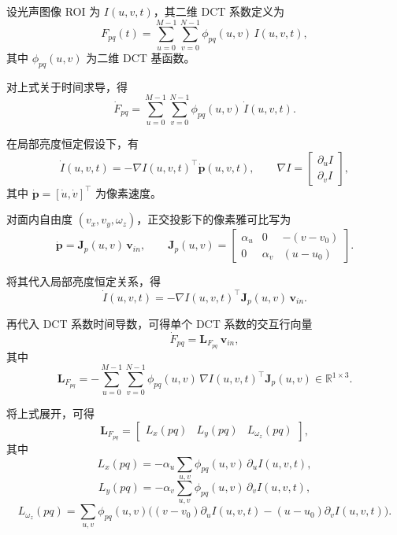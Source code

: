 \documentclass{article}
\begin{document}
设光声图像 ROI 为 $I(u,v,t)$，其二维 DCT 系数定义为
\begin{equation}
F_{pq}(t) = \sum_{u=0}^{M-1}\sum_{v=0}^{N-1}\phi_{pq}(u,v)\,I(u,v,t),
\end{equation}
其中 $\phi_{pq}(u,v)$ 为二维 DCT 基函数。

对上式关于时间求导，得
\begin{equation}
\dot{F}_{pq} = \sum_{u=0}^{M-1}\sum_{v=0}^{N-1}\phi_{pq}(u,v)\,\dot{I}(u,v,t).
\end{equation}

在局部亮度恒定假设下，有
\begin{equation}
\dot{I}(u,v,t) = -\nabla I(u,v,t)^{\top}\dot{\mathbf{p}}(u,v,t), \qquad
\nabla I =
\begin{bmatrix}
\partial_u I \\ \partial_v I
\end{bmatrix},
\end{equation}
其中 $\dot{\mathbf{p}} = [\dot{u}, \dot{v}]^\top$ 为像素速度。

对面内自由度 $(v_x,v_y,\omega_z)$，正交投影下的像素雅可比写为
\begin{equation}
\dot{\mathbf{p}} = \mathbf{J}_{p}(u,v)\,\mathbf{v}_{in}, \qquad
\mathbf{J}_{p}(u,v) =
\begin{bmatrix}
\alpha_u & 0 & -(v-v_0) \\
0 & \alpha_v & (u-u_0)
\end{bmatrix}.
\end{equation}

将其代入局部亮度恒定关系，得
\begin{equation}
\dot{I}(u,v,t) = -\nabla I(u,v,t)^{\top}\mathbf{J}_{p}(u,v)\,\mathbf{v}_{in}.
\end{equation}

再代入 DCT 系数时间导数，可得单个 DCT 系数的交互行向量
\begin{equation}
\dot{F}_{pq} = \mathbf{L}_{F_{pq}}\,\mathbf{v}_{in},
\end{equation}
其中
\begin{equation}
\mathbf{L}_{F_{pq}}
=
-\sum_{u=0}^{M-1}\sum_{v=0}^{N-1}
\phi_{pq}(u,v)\,\nabla I(u,v,t)^{\top}\mathbf{J}_{p}(u,v)
\in \mathbb{R}^{1\times 3}.
\end{equation}

将上式展开，可得
\begin{equation}
\mathbf{L}_{F_{pq}} =
\begin{bmatrix}
L_x(pq) & L_y(pq) & L_{\omega_z}(pq)
\end{bmatrix},
\end{equation}
其中
\begin{equation}
L_x(pq) = -\alpha_u \sum_{u,v}\phi_{pq}(u,v)\,\partial_u I(u,v,t),
\end{equation}
\begin{equation}
L_y(pq) = -\alpha_v \sum_{u,v}\phi_{pq}(u,v)\,\partial_v I(u,v,t),
\end{equation}
\begin{equation}
L_{\omega_z}(pq)
=
\sum_{u,v}\phi_{pq}(u,v)\Big((v-v_0)\partial_u I(u,v,t) - (u-u_0)\partial_v I(u,v,t)\Big).
\end{equation}
\end{document}

